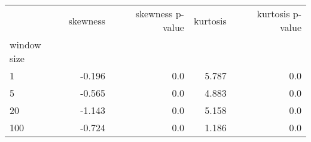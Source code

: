 \begin{tabular}{lrrrr}
\toprule
{} &  skewness &  skewness p-value &  kurtosis &  kurtosis p-value \\
window size &           &                   &           &                   \\
\midrule
1           &    -0.196 &               0.0 &     5.787 &               0.0 \\
5           &    -0.565 &               0.0 &     4.883 &               0.0 \\
20          &    -1.143 &               0.0 &     5.158 &               0.0 \\
100         &    -0.724 &               0.0 &     1.186 &               0.0 \\
\bottomrule
\end{tabular}
